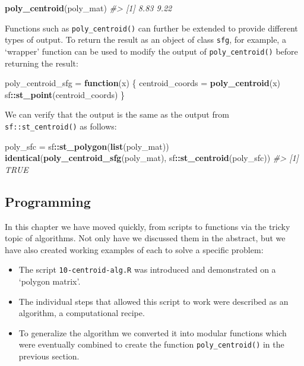 \documentclass[]{krantz}
\newenvironment{Shaded}{\begin{snugshade}}{\end{snugshade}}
\newcommand{\CommentTok}[1]{\textcolor[rgb]{0.37,0.37,0.37}{\textit{#1}}}
\newcommand{\ControlFlowTok}[1]{\textcolor[rgb]{0.27,0.27,0.27}{\textbf{#1}}}
\newcommand{\KeywordTok}[1]{\textcolor[rgb]{0.27,0.27,0.27}{\textbf{#1}}}
\newcommand{\NormalTok}[1]{#1}
\newcommand{\OperatorTok}[1]{\textcolor[rgb]{0.43,0.43,0.43}{\textbf{#1}}}
\newcommand{\StringTok}[1]{\textcolor[rgb]{0.5,0.5,0.5}{#1}}
\providecommand{\tightlist}{%
  \setlength{\itemsep}{0pt}\setlength{\parskip}{0pt}}
\begin{document}
\begin{Shaded}
\begin{Highlighting}[]
\KeywordTok{poly_centroid}\NormalTok{(poly_mat)}
\CommentTok{#> [1] 8.83 9.22}
\end{Highlighting}
\end{Shaded}

Functions such as \texttt{poly\_centroid()} can further be extended to provide different types of output.
To return the result as an object of class \texttt{sfg}, for example, a `wrapper' function can be used to modify the output of \texttt{poly\_centroid()} before returning the result:

\begin{Shaded}
\begin{Highlighting}[]
\NormalTok{poly_centroid_sfg =}\StringTok{ }\ControlFlowTok{function}\NormalTok{(x) \{}
\NormalTok{  centroid_coords =}\StringTok{ }\KeywordTok{poly_centroid}\NormalTok{(x)}
\NormalTok{  sf}\OperatorTok{::}\KeywordTok{st_point}\NormalTok{(centroid_coords)}
\NormalTok{\}}
\end{Highlighting}
\end{Shaded}

We can verify that the output is the same as the output from \texttt{sf::st\_centroid()} as follows:

\begin{Shaded}
\begin{Highlighting}[]
\NormalTok{poly_sfc =}\StringTok{ }\NormalTok{sf}\OperatorTok{::}\KeywordTok{st_polygon}\NormalTok{(}\KeywordTok{list}\NormalTok{(poly_mat))}
\KeywordTok{identical}\NormalTok{(}\KeywordTok{poly_centroid_sfg}\NormalTok{(poly_mat), sf}\OperatorTok{::}\KeywordTok{st_centroid}\NormalTok{(poly_sfc))}
\CommentTok{#> [1] TRUE}
\end{Highlighting}
\end{Shaded}

\hypertarget{programming}{%
\subsection{Programming}\label{programming}}

In this chapter we have moved quickly, from scripts to functions via the tricky topic of algorithms.
Not only have we discussed them in the abstract, but we have also created working examples of each to solve a specific problem:

\begin{itemize}
\tightlist
\item
  The script \texttt{10-centroid-alg.R} was introduced and demonstrated on a `polygon matrix'.
\item
  The individual steps that allowed this script to work were described as an algorithm, a computational recipe.
\item
  To generalize the algorithm we converted it into modular functions which were eventually combined to create the function \texttt{poly\_centroid()} in the previous section.
\end{itemize}
\end{document}
